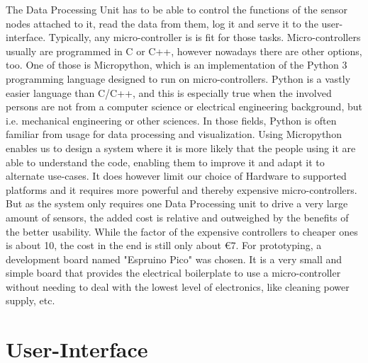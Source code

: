 The Data Processing Unit has to be able to control the functions of the sensor nodes attached to it, read the data from them, log it and serve it to the user-interface. Typically, any micro-controller is is fit for those tasks. Micro-controllers usually are programmed in C or C++, however nowadays there are other options, too. One of those is Micropython, which is an implementation of the Python 3 programming language designed to run on micro-controllers. Python is a vastly easier language than C/C++, and this is especially true when the involved persons are not from a computer science or electrical engineering background, but i.e. mechanical engineering or other sciences. In those fields, Python is often familiar from usage for data processing and visualization. Using Micropython enables us to design a system where it is more likely that the people using it are able to understand the code, enabling them to improve it and adapt it to alternate use-cases.
It does however limit our choice of Hardware to supported platforms and it requires more powerful and thereby expensive micro-controllers. But as the system only requires one Data Processing unit to drive a very large amount of sensors, the added cost is relative and outweighed by the benefits of the better usability. While the factor of the expensive controllers to cheaper ones is about 10, the cost in the end is still only about \euro{7}.
For prototyping, a development board named "Espruino Pico" was chosen. It is a very small and simple board that provides the electrical boilerplate to use a micro-controller without needing to deal with the lowest level of electronics, like cleaning power supply, etc.

\section{User-Interface}